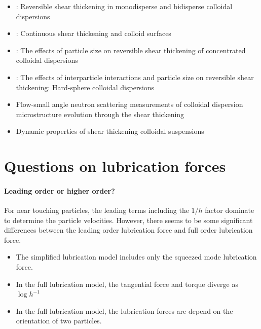 \documentclass[12pt]{article}
\begin{document}
\begin{itemize}
 \item \citet{Bender_1996}:
Reversible shear thickening in monodisperse and bidisperse colloidal dispersions
 \item \citet{Melrose_1996}:
Continuous shear thickening and colloid surfaces
 \item \citet{Maranzano_2001}:
The effects of particle size on reversible shear thickening of concentrated colloidal dispersions
 \item \citet{Maranzano_2001a}:
The effects of interparticle interactions and particle size 
on reversible shear thickening: Hard-sphere colloidal dispersions
 \item \citet{Maranzano_2002}
Flow-small angle neutron scattering measurements 
of colloidal dispersion microstructure evolution through the shear thickening 
 \item \cite{Lee_2003}
Dynamic properties of shear thickening colloidal suspensions

 \end{itemize}

\section{Questions on lubrication forces}


\paragraph{Leading order or higher order?}

For near touching particles,
the leading terms including the $1/h$ factor
dominate to determine the particle velocities.
%
However, there seems
to be some significant differences
between the leading order lubrication force 
and full order lubrication force.

\begin{itemize}
  \item The simplified lubrication model
  includes only the squeezed mode lubrication force.
  \item 
  In the full lubrication model,
  the tangential force and torque
  diverge as $\log h^{-1}$
  \item 
  In the full lubrication model,
  the lubrication forces are depend on
  the orientation of two particles.
\end{itemize}
\end{document}

